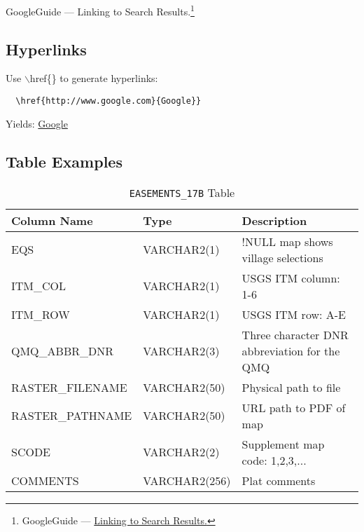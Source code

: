 \documentclass[12pt,letterpaper,dvips]{article}
\newcommand{\cmd}[1]{\texttt{#1}}
\begin{document}
\noindent GoogleGuide --- Linking to Search
Results.\footnote{GoogleGuide --- \href{http://www.googleguide.com/linking.html}{Linking to Search Results.}}


\subsection{Hyperlinks}
Use $\backslash$href\{\} to generate hyperlinks:

\begin{verbatim}
  \href{http://www.google.com}{Google}}
\end{verbatim}

\noindent Yields: \href{http://www.google.com}{Google}


\subsection{Table Examples}
\begin{table}[htb]
\begin{tabular}{|p{}|p{}|p{}|}\hline 
Column Name&Type&Description\\ 
\hline
EQS&VARCHAR2(1)&!NULL map shows village selections\\
ITM\_COL&VARCHAR2(1)&USGS ITM column: 1-6\\
ITM\_ROW&VARCHAR2(1)&USGS ITM row: A-E\\
QMQ\_ABBR\_DNR&VARCHAR2(3)&Three character DNR abbreviation for the QMQ\\
RASTER\_FILENAME&VARCHAR2(50)&Physical path to file\\
RASTER\_PATHNAME&VARCHAR2(50)&URL path to PDF of map\\
SCODE&VARCHAR2(2)&Supplement map code: 1,2,3,...\\
COMMENTS&VARCHAR2(256)&Plat comments\\
\hline
\end{tabular}
\caption {\cmd{EASEMENTS\_17B} Table}
\label{table:easements_17b}
\end{table}
\end{document}
